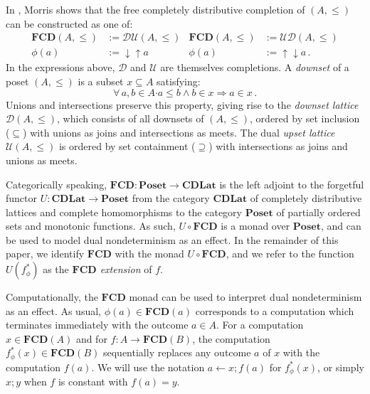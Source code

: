 \documentclass[sigplan,screen]{acmart}
\newcommand{\bdot}{\boldsymbol{\cdot}}
\begin{document}
In \cite{augtyp}, Morris shows that
the free completely distributive completion of $(A, \le)$
can be constructed as one of:
\begin{align*}
  \mathbf{FCD}(A, {\le}) &:= \mathcal{D} \mathcal{U}(A, {\le}) &
  \mathbf{FCD}(A, {\le}) &:= \mathcal{U} \mathcal{D}(A, {\le}) \\
  \phi(a) &:= {\downarrow}{\uparrow} a &
  \phi(a) &:= {\uparrow}{\downarrow} a \,.
\end{align*}
In the expressions above,
$\mathcal{D}$ and $\mathcal{U}$
are themselves completions.
A \emph{downset} of a poset $(A, {\le})$
is a subset $x \subseteq A$ satisfying:
\[
  \forall \, a, b \in A \bdot
          a \le b \wedge b \in x \Rightarrow a \in x \,.
\]
Unions and intersections preserve this property,
giving rise to the \emph{downset lattice} $\mathcal{D}(A, {\le})$,
which consists of all downsets of $(A, {\le})$,
ordered by set inclusion (${\subseteq}$) with
unions as joins and intersections as meets.
The dual \emph{upset lattice} $\mathcal{U}(A, {\le})$
is ordered by set containment (${\supseteq}$) with
intersections as joins and unions as meets.

Categorically speaking,
$\mathbf{FCD} : \mathbf{Poset} \rightarrow \mathbf{CDLat}$
is the left adjoint to the forgetful functor
$U : \mathbf{CDLat} \rightarrow \mathbf{Poset}$
from the category $\mathbf{CDLat}$
of completely distributive lattices and complete homomorphisms
to the category $\mathbf{Poset}$
of partially ordered sets and monotonic functions.
As such, $U \! \circ \mathbf{FCD}$ is a monad over $\mathbf{Poset}$,
and can be used to model dual nondeterminism
as an effect.
In the remainder of this paper,
we identify $\mathbf{FCD}$ with
the monad $U \! \circ \mathbf{FCD}$,
and we refer to the function
$U(f_\phi^*)$ as the \emph{$\mathbf{FCD}$ extension} of $f$.

Computationally,
the $\mathbf{FCD}$ monad can be used to interpret
dual nondeterminism as an effect.
As usual,
$\phi(a) \in \mathbf{FCD}(a)$
corresponds to a computation which
terminates immediately with the outcome $a \in A$.
For a computation $x \in \mathbf{FCD}(A)$
and for $f : A \rightarrow \mathbf{FCD}(B)$,
the computation $f_\phi^*(x) \in \mathbf{FCD}(B)$
sequentially replaces
any outcome $a$ of $x$ with the computation $f(a)$.
We will use the notation
$a \leftarrow x ; f(a)$ for $f^*_\phi(x)$,
or simply $x ; y$ when $f$ is constant with $f(a) = y$.
\end{document}
